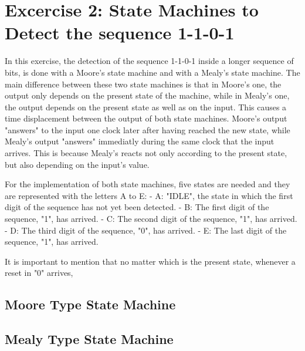 
\section{\color{olive}Excercise 2: State Machines to Detect the sequence 1-1-0-1}
In this exercise, the detection of the sequence 1-1-0-1 inside a longer sequence of bits, is done with a Moore's state machine and with a Mealy's state machine. The main difference between these two state machines is that in Moore's one, the output only depends on the present state of the machine, while in Mealy's one, the output depends on the present state as well as on the input. This causes a time displacement between the output of both state machines. Moore's output "answers" to the input one clock later after having reached the new state, while Mealy's output "answers" immediatly during the same clock that the input arrives. This is because Mealy's reacts not only according to the present state, but also depending on the input's value.

For the implementation of both state machines, five states are needed and they are represented with the letters A to E:
- A: "IDLE", the state in which the first digit of the sequence has not yet been detected.
- B: The first digit of the sequence, "1", has arrived.
- C: The second digit of the sequence, "1",  has arrived.
- D: The third digit of the sequence, "0", has arrived.
- E: The last digit of the sequence, "1", has arrived.

It is important to mention that no matter which is the present state, whenever a reset in "0" arrives,

\subsection{\color{purple}Moore Type State Machine}




\subsection{\color{purple}Mealy Type State Machine}
